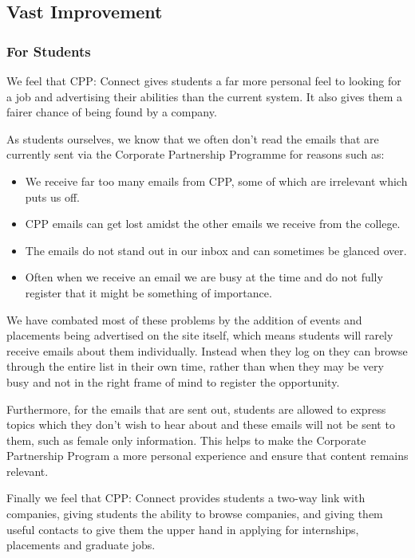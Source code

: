 \subsection{Vast Improvement}
\subsubsection{For Students}
We feel that CPP: Connect gives students a far more personal feel to looking for a job and advertising their abilities than the current system. It also gives them a fairer chance of being found by a company.

As students ourselves, we know that we often don't read the emails that are currently sent via the Corporate Partnership Programme for reasons such as:
\begin{itemize}
  \item We receive far too many emails from CPP, some of which are irrelevant which puts us off.
  \item CPP emails can get lost amidst the other emails we receive from the college.
  \item The emails do not stand out in our inbox and can sometimes be glanced over.
  \item Often when we receive an email we are busy at the time and do not fully register that it might be something of importance.
\end{itemize} 

We have combated most of these problems by the addition of events and placements being advertised on the site itself, which means students will rarely receive emails about them individually. Instead when they log on they can browse through the entire list in their own time, rather than when they may be very busy and not in the right frame of mind to register the opportunity.

Furthermore, for the emails that are sent out, students are allowed to express topics which they don't wish to hear about and these emails will not be sent to them, such as female only information. This helps to make the Corporate Partnership Program a more personal experience and ensure that content remains relevant.

Finally we feel that CPP: Connect provides students a two-way link with companies, giving students the ability to browse companies, and giving them useful contacts to give them the upper hand in applying for internships, placements and graduate jobs.

